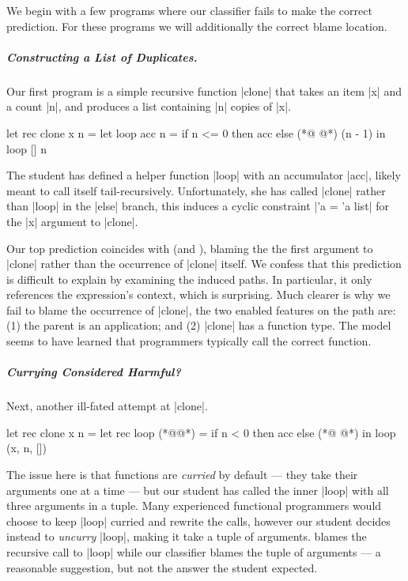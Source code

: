 We begin with a few programs where our classifier fails to
make the correct prediction.
%
For these programs we will additionally  the
correct blame location.

\subparagraph{Constructing a List of Duplicates.}
Our first program is a simple recursive function |clone| that takes an
item |x| and a count |n|, and produces a list containing |n| copies of
|x|.
%
\begin{ecode}
  let rec clone x n =
    let loop acc n =
      if n <= 0 then
        acc
      else
        (*@ @*) (n - 1) in
    loop [] n
\end{ecode}
%
The student has defined a helper function |loop| with an accumulator
|acc|, likely meant to call itself tail-recursively.
%
Unfortunately, she has called |clone| rather than
|loop| in the |else| branch, this induces a cyclic constraint |'a = 'a list|
for the |x| argument to |clone|.

Our top prediction coincides with \sherrloc (and \ocaml), blaming the
the first argument to |clone| rather than the occurrence of |clone| itself.
%
%
We confess that this prediction is difficult to explain by
examining the induced paths.
%
In particular, it only references the expression's context,
which is surprising.
%
Much clearer is why we fail to blame the occurrence of |clone|, the two
enabled features on the path are:
%
(1) the parent is an application; and
%
(2) |clone| has a function type.
%
The model seems to have learned that programmers typically call the
correct function.

\subparagraph{Currying Considered Harmful?}
Next, another ill-fated attempt at |clone|.
%
\begin{ecode}
  let rec clone x n =
    let rec loop (*@@*) =
      if n < 0 then
        acc
      else
        (*@ @*) in
    loop (x, n, [])
\end{ecode}
%
The issue here is that \ocaml functions are \emph{curried} by default
--- \ie they take their arguments one at a time --- but our student has
called the inner |loop| with all three arguments in a tuple.
%
Many experienced functional programmers would choose to keep |loop|
curried and rewrite the calls, however our student decides instead to
\emph{uncurry} |loop|, making it take a tuple of arguments.
%
\sherrloc blames the recursive call to |loop| while our classifier
blames the tuple of arguments --- a reasonable suggestion, but not
the answer the student expected.

